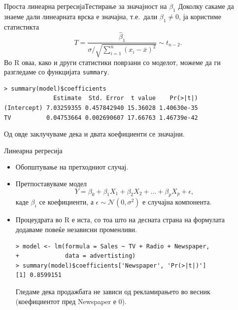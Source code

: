 \documentclass[hyperref={unicode}, xcolor={svgnames, table},
usepdftitle=false]{beamer}
\theoremstyle{remark}
\begin{document}
\begin{frame}[fragile]{Проста линеарна регресија}{Тестирање за значајност на
    \(\beta_1\)}
  Доколку сакаме да знаеме дали линеарната врска е значајна, т.е.\ дали
  \(\beta_1 \ne 0\), ја користиме статистикта
  \[
    T = \frac{\hat{\beta}_1}{\sigma / \sqrt{\sum\nolimits_{i = 1}^{n} (x_i -
        \bar{x})^2}} \sim t_{n - 2}\text{.}
  \]
  Во R оваа, како и други статистики поврзани со моделот, можеме да ги
  разгледаме со функцијата \texttt{summary}.
\begin{verbatim}
> summary(model)$coefficients
              Estimate  Std. Error  t value    Pr(>|t|)
(Intercept) 7.03259355 0.457842940 15.36028 1.40630e-35
TV          0.04753664 0.002690607 17.66763 1.46739e-42
\end{verbatim}
  Од овде заклучуваме дека и двата коефициенти се значајни.
\end{frame}

\begin{frame}[fragile]{Линеарна регресија}
  \begin{itemize}
  \item Обопштување на претходниот случај.
  \item Претпоставуваме модел
    \[
      Y = \beta_0 + \beta_1 X_1 + \beta_2 X_2 + \ldots + \beta_p X_p +
      \epsilon\text{,}
    \]
    каде \(\beta_i\) се коефициенти, а
    \(\epsilon \sim \mathcal{N}(0, \sigma^2)\) е случајна компонента.
  \item Процеудрата во R е иста, со тоа што на десната страна на формулата
    додаваме повеќе независни променливи.
\begin{verbatim}
> model <- lm(formula = Sales ~ TV + Radio + Newspaper,
+             data = advertisting)
> summary(model)$coefficients['Newspaper', 'Pr(>|t|)']
[1] 0.8599151
\end{verbatim}
    Гледаме дека продажбата не зависи од рекламирањето во весник (коефициентот
    пред Newspaper е \num{0}).
  \end{itemize}
\end{frame}
\end{document}
